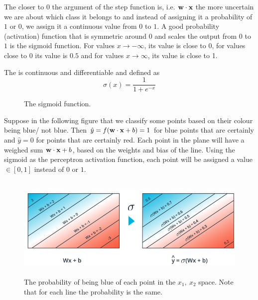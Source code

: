\documentclass[a4paper]{article}
\begin{document}
The closer to $0$ the argument of the step function is, i.e. $\textbf{w}\cdot \textbf{x}$ the more uncertain we are about which class it belongs to and instead of assigning it a probability of $1$ or $0$, we assign it a continuous value from $0$ to $1$. A good probability (activation) function that is symmetric around $0$ and scales the output from $0$ to $1$ is the sigmoid function. For values $x\rightarrow -\infty$, its value is close to 0, for values close to $0$ its value is $0.5$ and for values $x\rightarrow \infty$, its value is close to 1.

\begin{definition} 
The  is continuous and differentiable and defined as
\begin{equation}
    \sigma(x) = \frac{1}{1 + e^{-x}}
\end{equation}
\end{definition}
\begin{figure}[H]
    \centering
    
    \caption{The sigmoid function.}
\end{figure}
Suppose in the following figure that we classify some points based on their colour being blue/ not blue. Then $\hat{y}=f(\textbf{w}\cdot \textbf{x} + b)=1$ for blue points that are certainly and $\hat{y}=0$ for points that are certainly red. Each point in the plane will have a weighed sum $\textbf{w}\cdot \textbf{x} + b$, based on the weights and bias of the line. Using the sigmoid as the perceptron activation function, each point will be assigned a value $\in[0,1]$ instead of 0 or $1$.
\begin{figure}[H]
    \centering
    \includegraphics[height=5cm]{img/sigmoid_of_perc.PNG}
    \caption{The probability of being blue of each point in the $x_1,\ x_2$ space. Note that for each line the probability is the same.}
    \label{fig:my_label}
\end{figure}
\end{document}
